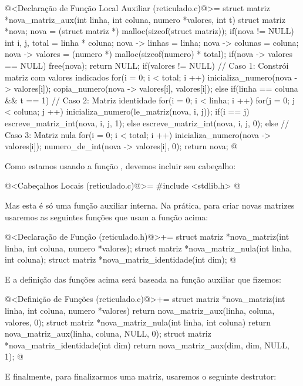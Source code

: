 \iniciocodigo
@<Declaração de Função Local Auxiliar (reticulado.c)@>=
struct matriz *nova_matriz_aux(int linha, int coluna, numero *valores,
                               int t){
  struct matriz *nova;
  nova = (struct matriz *) malloc(sizeof(struct matriz));
  if(nova != NULL){
    int i, j, total = linha * coluna;
    nova -> linhas = linha;
    nova -> colunas = coluna;
    nova -> valores = (numero *) malloc(sizeof(numero) * total);
    if(nova -> valores == NULL){
      free(nova);
      return NULL;
    }
    if(valores != NULL){ // Caso 1: Constrói matriz com valores indicados
      for(i = 0; i < total; i ++){
        inicializa_numero(nova -> valores[i]);
        copia_numero(nova -> valores[i], valores[i]);
      }
    }
    else if(linha == coluna && t == 1){ // Caso 2: Matriz identidade
      for(i = 0; i < linha; i ++)
        for(j = 0; j < coluna; j ++){
          inicializa_numero(le_matriz(nova, i, j));
          if(i == j)
            escreve_matriz_int(nova, i, j, 1);
          else
            escreve_matriz_int(nova, i, j, 0);
        }
    }
    else{ // Caso 3: Matriz nula
      for(i = 0; i < total; i ++){
        inicializa_numero(nova -> valores[i]);
        numero_de_int(nova -> valores[i], 0);
      }
    }
  }
  return nova;
}
@
\fimcodigo

Como estamos usando a função , devemos incluir seu
cabeçalho:

\iniciocodigo
@<Cabeçalhos Locais (reticulado.c)@>=
#include <stdlib.h>
@
\fimcodigo

Mas esta é só uma função auxiliar interna. Na prática, para criar
novas matrizes usaremos as seguintes funções que usam a função acima:

\iniciocodigo
@<Declaração de Função (reticulado.h)@>+=
struct matriz *nova_matriz(int linha, int coluna, numero *valores);
struct matriz *nova_matriz_nula(int linha, int coluna);
struct matriz *nova_matriz_identidade(int dim);
@
\fimcodigo

E a definição das funções acima será baseada na função auxiliar que
fizemos:

\iniciocodigo
@<Definição de Funções (reticulado.c)@>+=
struct matriz *nova_matriz(int linha, int coluna, numero *valores){
  return nova_matriz_aux(linha, coluna, valores, 0);
}
struct matriz *nova_matriz_nula(int linha, int coluna){
  return nova_matriz_aux(linha, coluna, NULL, 0);
}
struct matriz *nova_matriz_identidade(int dim){
  return nova_matriz_aux(dim, dim, NULL, 1);
}
@
\fimcodigo

E finalmente, para finalizarmos uma matriz, usaremos o seguinte
destrutor:

